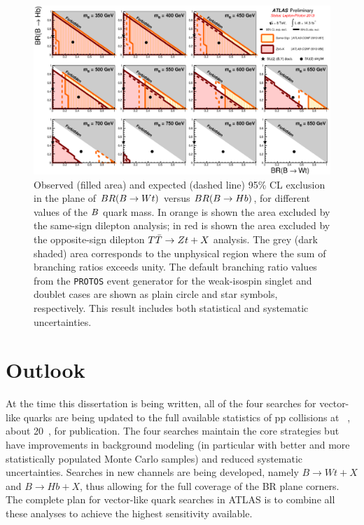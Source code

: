 \begin{landscape}
\begin{figure}[h!bt]
\centering
\includegraphics[width=1.5\textwidth]{results/figures/ATLAS_VLQ_BB_june2013_step2.eps}
\caption{
Observed (filled area) and expected (dashed line) 95\% CL exclusion in the plane of
$BR(\B \to Wt)$ versus $BR(\B \to Hb)$, for different values of the $\B$ quark mass.
In orange is shown the area excluded by the same-sign dilepton analysis;
in red is shown the area excluded by the opposite-sign dilepton $\TTbar\to Zt+X$ analysis.
The grey (dark shaded) area corresponds to the unphysical region where the sum of branching ratios exceeds unity. 
The default branching ratio values from the \texttt{PROTOS} event generator for the weak-isospin singlet and doublet cases 
are shown as plain circle and star symbols, respectively. This result includes both statistical and systematic uncertainties.
\label{fig:limits2D_allvlb}}
\end{figure}
\end{landscape}



\section{Outlook}\label{sec:combOUT}

At the time this dissertation is being
written, all of the four searches for
vector-like quarks are being updated to
the full available statistics of
pp collisions at ~\tev, about 20~\ifb,
for publication. The four searches maintain the
core strategies but have improvements in
background modeling (in particular with better
and more statistically populated Monte Carlo samples)
and reduced systematic uncertainties.
Searches in new channels are being developed, namely
$B\to Wt+X$ and $B\to Hb+X$, thus allowing for
the full coverage of the BR plane corners.
The complete plan for vector-like quark searches
in ATLAS is to combine all these analyses to 
achieve the highest sensitivity available.
